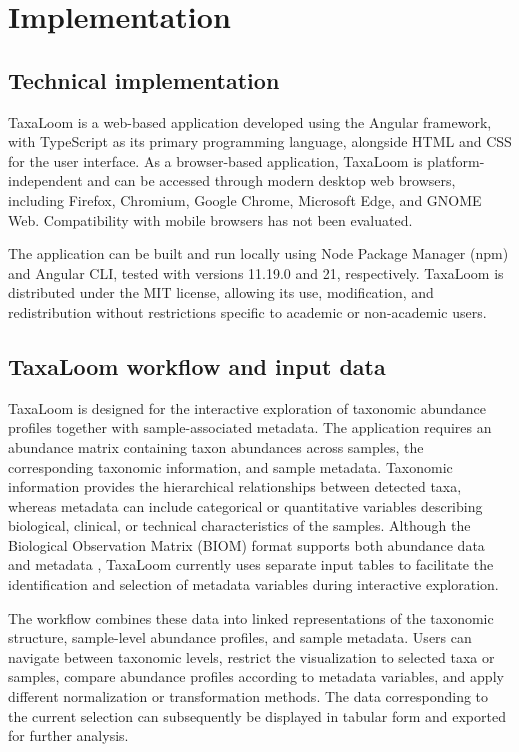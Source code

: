 \documentclass[pdflatex,sn-vancouver-num]{sn-jnl}%
\theoremstyle{thmstyleone}%
\theoremstyle{thmstyletwo}%
\theoremstyle{thmstylethree}%
\begin{document}
\section{Implementation}\label{sec2}

\subsection{Technical implementation}

TaxaLoom is a web-based application developed using the Angular framework, with TypeScript as its primary programming language, alongside HTML and CSS for the user interface. As a browser-based application, TaxaLoom is platform-independent and can be accessed through modern desktop web browsers, including Firefox, Chromium, Google Chrome, Microsoft Edge, and GNOME Web. Compatibility with mobile browsers has not been evaluated.

The application can be built and run locally using Node Package Manager (npm) and Angular CLI, tested with versions 11.19.0 and 21, respectively. TaxaLoom is distributed under the MIT license, allowing its use, modification, and redistribution without restrictions specific to academic or non-academic users.

\subsection{TaxaLoom workflow and input data}

TaxaLoom is designed for the interactive exploration of taxonomic abundance profiles together with sample-associated metadata. The application requires an abundance matrix containing taxon abundances across samples, the corresponding taxonomic information, and sample metadata. Taxonomic information provides the hierarchical relationships between detected taxa, whereas metadata can include categorical or quantitative variables describing biological, clinical, or technical characteristics of the samples. Although the Biological Observation Matrix (BIOM) format supports both abundance data and metadata \citep{mcdonald_biological_2012}, TaxaLoom currently uses separate input tables to facilitate the identification and selection of metadata variables during interactive exploration.

The workflow combines these data into linked representations of the taxonomic structure, sample-level abundance profiles, and sample metadata. Users can navigate between taxonomic levels, restrict the visualization to selected taxa or samples, compare abundance profiles according to metadata variables, and apply different normalization or transformation methods. The data corresponding to the current selection can subsequently be displayed in tabular form and exported for further analysis.
\end{document}
